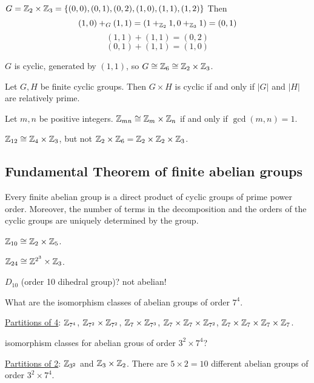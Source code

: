 \documentclass[]{article}
\begin{document}
\begin{example}
	$G = \mathbb{Z}_2\times\mathbb{Z}_3 = \left\{ (0,0),(0,1),(0,2),(1,0),(1,1),(1,2) \right\}$
	Then $$(1,0)+_G(1,1) = (1+_{\mathbb{Z}_2}1,0+_{\mathbb{Z}_3}1) = (0,1) $$
	$$ (1,1)+(1,1) = (0,2) $$
	$$ (0,1)+(1,1) = (1,0) $$
\end{example}
\begin{note}
	$G$ is cyclic, generated by $(1,1)$, so $G\cong\mathbb{Z}_6\cong\mathbb{Z}_2\times\mathbb{Z}_3$.
\end{note}
\begin{fact}
	 Let $G,H$ be finite cyclic groups.
	Then $G\times H$ is cyclic if and only if $|G|$ and $|H|$ are relatively prime.
\end{fact}
\begin{corollary}
	Let $m,n$ be positive integers. $\mathbb{Z}_{mn}\cong\mathbb{Z}_m\times\mathbb{Z}_n$ if and only if $\gcd(m,n)=1$.
\end{corollary}
\begin{example}
	$\mathbb{Z}_{12}\cong\mathbb{Z}_4\times\mathbb{Z}_3$, but not $\mathbb{Z}_2\times\mathbb{Z}_6 = \mathbb{Z}_2\times\mathbb{Z}_2\times\mathbb{Z}_3$.
\end{example}

\subsection{Fundamental Theorem of finite abelian groups}

\begin{theorem}
	Every finite abelian group is a direct product of cyclic groups of prime power order.
	Moreover, the number of terms in the decomposition and the orders of the cyclic groups are uniquely determined by the group.
\end{theorem}
\begin{example}
	$\mathbb{Z}_{10}\cong\mathbb{Z}_2\times\mathbb{Z}_5$.
\end{example}
\begin{example}
	$\mathbb{Z}_{24}\cong \mathbb{Z}^{2^3}\times\mathbb{Z}_3$.
\end{example}
\begin{example}
	$D_{10}$ (order 10 dihedral group)? not abelian!
\end{example}
\begin{question}
	What are the isomorphism classes of abelian groups of order $7^4$.
\end{question}
\ul{Partitions of 4}: $\mathbb{Z}_{7^4}$, $\mathbb{Z}_{7^2}\times\mathbb{Z}_{7^2}$, $\mathbb{Z}_7\times\mathbb{Z}_{7^3}$, $\mathbb{Z}_7\times\mathbb{Z}_7\times\mathbb{Z}_{7^2}$, $\mathbb{Z}_7\times\mathbb{Z}_7\times\mathbb{Z}_7\times\mathbb{Z}_7$.
\begin{question}
	isomorphism classes for abelian grous of order $3^2\times 7^4$?
\end{question}
\ul{Partitions of 2}: $\mathbb{Z}_{3^2}$ and $\mathbb{Z}_3\times\mathbb{Z}_2$.
There are $5\times2=10$ different abelian groups of order $3^2\times7^4$.
\end{document}
